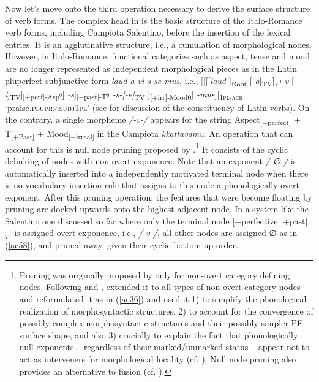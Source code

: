 \documentclass[output=paper]{langscibook}
\begin{document}
Now let's move onto the third operation necessary to derive the surface structure of verb forms. The complex head in   is the basic structure of the Italo-Romance verb forms, including Campiota Salentino, before the insertion of the lexical entries. It is an agglutinative structure, i.e., a cumulation of morphological nodes. However, in Italo-Romance, functional categories such as aspect, tense and mood are no longer represented as independent morphological pieces as in the Latin pluperfect subjunctive form \textit{laud-a-vi-s-se-mus}, i.e., [[[[\textit{laud-}]\textsubscript{Root} [\textit{-a}]\textsubscript{TV}]\textsubscript{v$^0$}\textit{-v-}[\textit{-i}]\textsubscript{TV}]\textsubscript{[+perf]-Asp$^0$}] \textit{-s}]\textsubscript{[+past]-T$^0$} \textit{-s-[-e]}\textsubscript{TV} ]\textsubscript{[+irr]-Mood0}] \textit{-mus}][\textsubscript{\textsc{1pl-agr}}  ‘praise.\textsc{plu\-prf}.\textsc{subj}\-\textsc{1pl}’ (see \citealt{calabrese2020} for discussion of the constituency of Latin verbs). On the contrary, a single morpheme \textit{/-v-/} appears for the string Aspect\textsubscript{[−perfect]} + T\textsubscript{[+Past]} + Mood\textsubscript{[−irreal]} in the Campiota \textit{kkattavamu}.  An operation that can account for this is null node pruning proposed by \citet{calabrese2019a}.\footnote{Pruning was originally proposed by \citet{embick2010a} only for non-overt category defining nodes. Following \citet{christopoulos2017a} and \citet{christopoulos2018a}, \citet{calabrese2019a} extended it to all types of non-overt category nodes and reformulated it as in (\ref{ac36}) and used it 1) to simplify the phonological realization of morphosyntactic structures, 2) to account for the convergence of possibly complex morphosyntactic structures and their possibly simpler PF surface shape, and also 3) crucially to explain the fact that phonologically null exponents -- regardless of their marked/unmarked status --  appear not to act as interveners for morphological locality (cf. \citealt{embick2010a, calabrese2019a}). Null node pruning also provides an alternative to fusion (cf. \citealt{halle1993a}).}
It consists of the cyclic delinking of nodes with non-overt exponence. Note that an exponent \textit{/-∅-/} is automatically  inserted  into a independently motivated  terminal node when there is no vocabulary insertion rule that assigns to this node a phonologically overt exponent.  After this pruning operation, the features that were become floating by pruning are docked upwards onto the highest adjacent node.  In a system like the Salentino one discussed so far where only the terminal node [−perfective, +past]$_{T^0}$ is assigned overt exponence, i.e., \textit{/-v-/}, all other nodes are assigned ∅ as in (\ref{ac58}), and pruned away, given their cyclic bottom up order.
\end{document}
